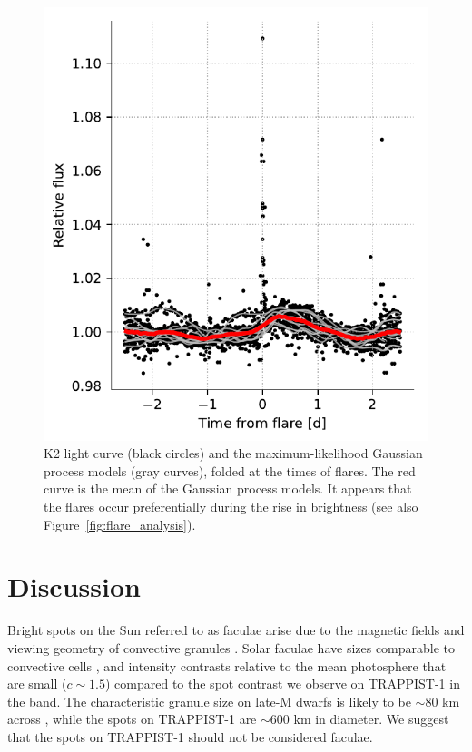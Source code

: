 \begin{figure}
\begin{center}
\includegraphics[scale=0.9]{trappist1_bright/flares_folded.pdf}
\end{center}
\caption{K2 light curve (black circles) and the maximum-likelihood Gaussian process models (gray curves), folded at the times of flares. The red curve is the mean of the Gaussian process models. It appears that the flares occur preferentially during the rise in brightness (see also Figure~\ref{fig:flare_analysis}). \label{fig:folded}}
\end{figure}


\section{Discussion}

Bright spots on the Sun referred to as faculae arise due to the magnetic fields and viewing geometry of convective granules \citep{Spruit1976, Spruit1977}. Solar faculae have sizes comparable to convective cells \citep{Keller2004}, and intensity contrasts relative to the mean photosphere that are small ($c \sim1.5$) compared to the spot contrast we observe on TRAPPIST-1 in the \kepler band. The characteristic granule size on late-M dwarfs is likely to be $\sim80$ km across \citep{ludwig2002}, while the spots on TRAPPIST-1 are $\sim 600$ km in diameter. We suggest that the spots on TRAPPIST-1 should not be considered faculae.

